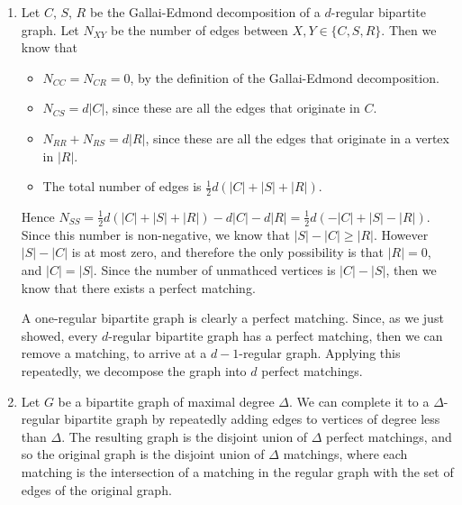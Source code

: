 \documentclass[11pt]{article} \usepackage{amssymb}
\newcommand{\half}{{\textstyle \frac12}}
\begin{document}
\begin{enumerate}
\item
  Let $C$, $S$, $R$ be the Gallai-Edmond decomposition of a $d$-regular
  bipartite graph. Let $N_{XY}$ be the number of edges between 
  $X,Y\in \{C,S,R\}$. Then we know that
  \begin{itemize}
  \item $N_{CC}=N_{CR}=0$, by the definition of the Gallai-Edmond decomposition.
  \item $N_{CS}=d|C|$, since these are all the edges that originate in $C$.
  \item $N_{RR}+N_{RS}=d|R|$, since these are all the edges that originate
    in a vertex in $|R|$.
  \item The total number of edges is $\half d(|C|+|S|+|R|)$. 
  \end{itemize}
  
  Hence $N_{SS}=\half d(|C|+|S|+|R|) - d|C|-d|R|=\half d(-|C|+|S|-|R|)$. Since this number
  is non-negative, we know that $|S|-|C|\geq |R|$. However $|S|-|C|$ is at most
  zero, and therefore the only possibility is that $|R|=0$, and $|C|=|S|$. 
  Since the number of unmathced vertices is $|C|-|S|$, then we know that there
  exists a perfect matching. 

  
  A one-regular bipartite graph is clearly a perfect matching. 
  Since, as we just showed, every $d$-regular bipartite graph has a perfect
  matching, then we can remove a matching, 
  to arrive at a $d-1$-regular graph. Applying
  this repeatedly, we decompose the graph into $d$ perfect matchings.

\item
  Let $G$ be a bipartite graph of maximal degree $\Delta$. We can complete it
  to a $\Delta$-regular bipartite graph by repeatedly adding edges to vertices
  of degree less than $\Delta$. The resulting graph is the disjoint union
  of $\Delta$ perfect matchings, and so the original graph is the disjoint
  union of $\Delta$ matchings, where each matching is the intersection of
  a matching in the regular graph with the set of edges of the original graph.
\end{enumerate}
\end{document}
